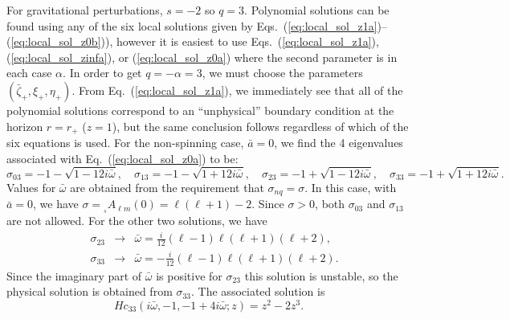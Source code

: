 \documentclass[11pt]{article}
\newcommand{\scA}[4][]{{}_{{}_{#2}}A^{#1}_{#3}(#4)}
\begin{document}
For gravitational perturbations, $s=-2$ so $q=3$.  Polynomial
solutions can be found using any of the six local solutions given by
Eqs.~(\ref{eq:local_sol_z1a})--(\ref{eq:local_sol_z0b})), however it
is easiest to use Eqs.~(\ref{eq:local_sol_z1a}),
(\ref{eq:local_sol_zinfa}), or (\ref{eq:local_sol_z0a}) where the
second parameter is in each case $\alpha$.  In order to get
$q=-\alpha=3$, we must choose the parameters
$(\bar\zeta_+,\xi_+,\eta_+)$.  From Eq.~(\ref{eq:local_sol_z1a}), we
immediately see that all of the polynomial solutions correspond to an
``unphysical'' boundary condition at the horizon $r=r_+$ ($z=1$), but
the same conclusion follows regardless of which of the six equations
is used.  For the non-spinning case, $\bar{a}=0$, we find the 4
eigenvalues associated with Eq.~(\ref{eq:local_sol_z0a}) to be:
\begin{equation}
\sigma_{03}=-1-\sqrt{1-12i\bar\omega},\quad
\sigma_{13}=-1-\sqrt{1+12i\bar\omega},\quad
\sigma_{23}=-1+\sqrt{1-12i\bar\omega},\quad
\sigma_{33}=-1+\sqrt{1+12i\bar\omega}.
\end{equation}
Values for $\bar\omega$ are obtained from the requirement that
$\sigma_{nq}=\sigma$.  In this case, with $\bar{a}=0$, we have
$\sigma=\scA{s}{\ell{m}}{0}=\ell(\ell+1)-2$.  Since $\sigma>0$, both
$\sigma_{03}$ and $\sigma_{13}$ are not allowed.  For the other
two solutions, we have
\begin{eqnarray}
  \quad\sigma_{23}&\to&\bar\omega=\frac{i}{12}(\ell-1)\ell(\ell+1)(\ell+2), \\
  \quad\sigma_{33}&\to&\bar\omega=-\frac{i}{12}(\ell-1)\ell(\ell+1)(\ell+2).
\end{eqnarray}
Since the imaginary part of $\bar\omega$ is positive for
$\sigma_{23}$ this solution is unstable, so the physical solution is
obtained from $\sigma_{33}$.  The associated solution is
\begin{equation}
  Hc_{33}(i\bar\omega,-1,-1+4i\bar\omega;z) = z^2-2z^3.
\end{equation}
\end{document}
